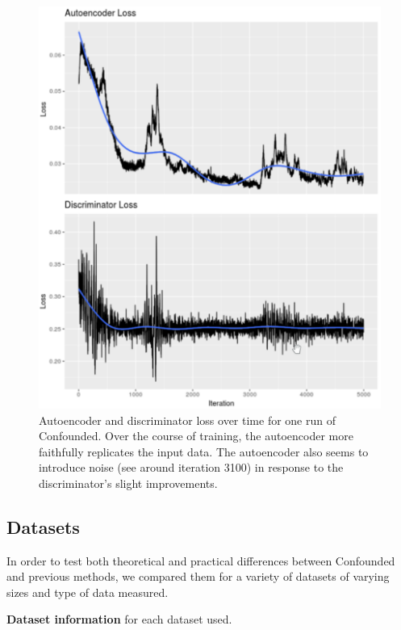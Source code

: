 \documentclass[notitlepage]{article}
\begin{document}
\begin{figure}
	\centering
	\includegraphics[width=\columnwidth]{figures/rough/training_loss.png}
	\caption{Autoencoder and discriminator loss over time for one run of Confounded.
	Over the course of training, the autoencoder more faithfully replicates the input data.
	The autoencoder also seems to introduce noise (see around iteration 3100) in response to the discriminator's slight improvements.}
	\label{fig:training_loss}
\end{figure}

\subsection{Datasets}

In order to test both theoretical and practical differences between Confounded and previous methods, we compared them for a variety of datasets of varying sizes and type of data measured.

\begin{table}
	\centering
	
	\caption{\textbf{Dataset information} for each dataset used.}
	\label{tab:datasets}
\end{table}
\end{document}
